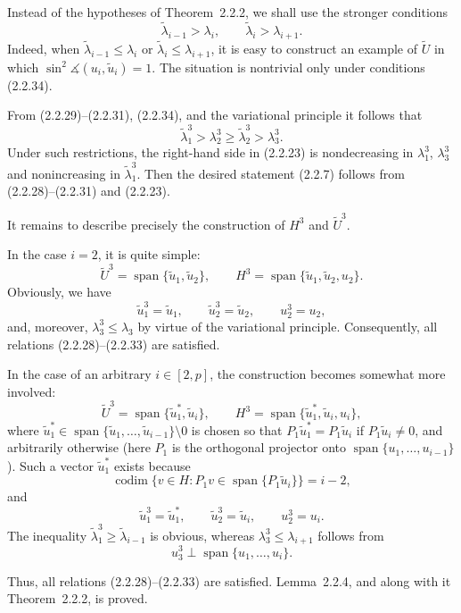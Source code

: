\documentclass[11pt,oneside]{book}
\newcommand{\myspan}{\operatorname{span}}
\newcommand{\ang}{\measuredangle}
\begin{document}
Instead of the hypotheses of Theorem~2.2.2, we shall use the stronger conditions
\[
\tilde{\lambda}_{i-1} > \lambda_i, \qquad \tilde{\lambda}_i > \lambda_{i+1}. \tag{2.2.34}
\]
Indeed, when $\tilde{\lambda}_{i-1} \leqslant \lambda_i$ or $\tilde{\lambda}_i \leqslant \lambda_{i+1}$, it is easy to construct an example of $\widetilde{U}$ in which $\sin^2 \ang(u_i, \tilde{u}_i) = 1$. The situation is nontrivial only under conditions (2.2.34).

From (2.2.29)--(2.2.31), (2.2.34), and the variational principle it follows that
\[
\tilde{\lambda}_1^3 > \lambda_2^3 \geqslant \tilde{\lambda}_2^3 > \lambda_3^3.
\]
Under such restrictions, the right-hand side in (2.2.23) is nondecreasing in $\lambda_1^3$, $\lambda_3^3$ and nonincreasing in $\tilde{\lambda}_1^3$. Then the desired statement (2.2.7) follows from (2.2.28)--(2.2.31) and (2.2.23).

It remains to describe precisely the construction of $H^3$ and $\widetilde{U}^3$.

In the case $i = 2$, it is quite simple:
\[
\widetilde{U}^3 = \myspan\{\tilde{u}_1, \tilde{u}_2\}, \qquad H^3 = \myspan\{\tilde{u}_1, \tilde{u}_2, u_2\}.
\]
Obviously, we have
\[
\tilde{u}_1^3 = \tilde{u}_1, \qquad \tilde{u}_2^3 = \tilde{u}_2, \qquad u_2^3 = u_2,
\]
and, moreover, $\lambda_3^3 \leqslant \lambda_3$ by virtue of the variational principle. Consequently, all relations (2.2.28)--(2.2.33) are satisfied.

In the case of an arbitrary $i \in [2, p]$, the construction becomes somewhat more involved:
\[
\widetilde{U}^3 = \myspan\{\tilde{u}_1^*, \tilde{u}_i\}, \qquad H^3 = \myspan\{\tilde{u}_1^*, \tilde{u}_i, u_i\},
\]
where $\tilde{u}_1^* \in \myspan\{\tilde{u}_1, \ldots, \tilde{u}_{i-1}\} \setminus 0$ is chosen so that $P_1 \tilde{u}_1^* = P_1 \tilde{u}_i$ if $P_1 \tilde{u}_i \neq 0$, and arbitrarily otherwise (here $P_1$ is the orthogonal projector onto $\myspan\{u_1, \ldots, u_{i-1}\}$). Such a vector $\tilde{u}_1^*$ exists because
\[
\operatorname{codim}\{v \in H : P_1 v \in \myspan\{P_1 \tilde{u}_i\}\} = i - 2,
\]
and
\[
\tilde{u}_1^3 = \tilde{u}_1^*, \qquad \tilde{u}_2^3 = \tilde{u}_i, \qquad u_2^3 = u_i.
\]
The inequality $\tilde{\lambda}_1^3 \geqslant \tilde{\lambda}_{i-1}$ is obvious, whereas $\lambda_3^3 \leqslant \lambda_{i+1}$ follows from
\[
u_3^3 \perp \myspan\{u_1, \ldots, u_i\}.
\]

Thus, all relations (2.2.28)--(2.2.33) are satisfied. Lemma~2.2.4, and along with it Theorem~2.2.2, is proved.
\end{document}
